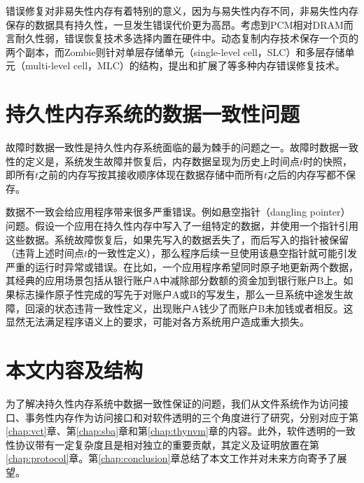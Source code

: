 错误修复对非易失性内存有着特别的意义，因为与易失性内存不同，非易失性内存保存的数据具有持久性，一旦发生错误代价更为高昂。考虑到PCM相对DRAM而言耐久性弱，错误恢复技术多选择内置在硬件中。动态复制内存技术\cite{Ipek:2010:DRM:1736020.1736023}保存一个页的两个副本，而Zombie\cite{Azevedo:2013:ZME:2485922.2485961}则针对单层存储单元（single-level cell，SLC）和多层存储单元（multi-level cell，MLC）的结构，提出和扩展了等多种内存错误修复技术。

\section{持久性内存系统的数据一致性问题}
\label{intro:crash-consistency}

故障时数据一致性是持久性内存系统面临的最为棘手的问题之一\cite{Onur:2014:RPO}。故障时数据一致性的定义是，系统发生故障并恢复后，内存数据呈现为历史上时间点$t$时的快照，即所有$t$之前的内存写按其接收顺序体现在数据存储中而所有$t$之后的内存写都不保存。

数据不一致会给应用程序带来很多严重错误。例如悬空指针（dangling pointer）问题\cite{Volos:2011:MLP:1950365.1950379,Coburn:2011:NMP:1950365.1950380}。假设一个应用在持久性内存中写入了一组特定的数据，并使用一个指针引用这些数据。系统故障恢复后，如果先写入的数据丢失了，而后写入的指针被保留（违背上述时间点$t$的一致性定义），那么程序后续一旦使用该悬空指针就可能引发严重的运行时异常或错误。在比如，一个应用程序希望同时原子地更新两个数据，其经典的应用场景包括从银行账户A中减除部分数额的资金加到银行账户B上。如果标志操作原子性完成的写先于对账户A或B的写发生，那么一旦系统中途发生故障，回滚的状态违背一致性定义，出现账户A钱少了而账户B未加钱或者相反。这显然无法满足程序语义上的要求，可能对各方系统用户造成重大损失。

\section{本文内容及结构}

为了解决持久性内存系统中数据一致性保证的问题，我们从文件系统作为访问接口、事务性内存作为访问接口和对软件透明的三个角度进行了研究，分别对应于第\ref{chap:vct}章、第\ref{chap:sba}章和第\ref{chap:thynvm}章的内容。此外，软件透明的一致性协议带有一定复杂度且是相对独立的重要贡献，其定义及证明放置在第\ref{chap:protocol}章。第\ref{chap:conclusion}章总结了本文工作并对未来方向寄予了展望。

